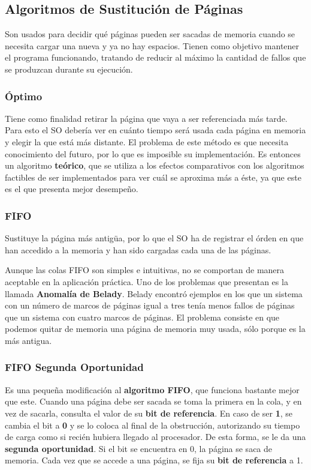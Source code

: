 \documentclass[10pt,a4paper]{article}
\begin{document}
\subsection{Algoritmos de Sustitución de Páginas}
Son usados para decidir qué páginas pueden ser sacadas de memoria cuando se necesita cargar una nueva y ya no hay espacios. Tienen como objetivo mantener el programa funcionando, tratando de reducir al máximo la cantidad de fallos que se produzcan durante su ejecución.

\subsubsection{Óptimo}
Tiene como finalidad retirar la página que vaya a ser referenciada más tarde. Para esto el SO debería ver en cuánto tiempo será usada cada página en memoria y elegir la que está más distante. El problema de este método es que necesita conocimiento del futuro, por lo que es imposible su implementación. Es entonces un algoritmo \textbf{teórico}, que se utiliza a los efectos comparativos con los algoritmos factibles de ser implementados para ver cuál se aproxima más a éste, ya que este es el que presenta mejor desempeño.

\subsubsection{FIFO}
Sustituye la página más antigüa, por lo que el SO ha de registrar el órden en que han accedido a la memoria y han sido cargadas cada una de las páginas.

Aunque las colas FIFO son simples e intuitivas, no se comportan de manera aceptable en la aplicación práctica. Uno de los problemas que presentan es la llamada \textbf{Anomalía de Belady}. Belady encontró ejemplos en los que un sistema con un número de marcos de páginas igual a tres tenía menos fallos de páginas que un sistema con cuatro marcos de páginas. El problema consiste en que podemos quitar de memoria una página de memoria muy usada, sólo porque es la más antigua.

\subsubsection{FIFO Segunda Oportunidad}
Es una pequeña modificación al \textbf{algoritmo FIFO}, que funciona bastante mejor que este. Cuando una página debe ser sacada se toma la primera en la cola, y en vez de sacarla, consulta el valor de su \textbf{bit de referencia}. En caso de ser \textbf{1}, se cambia el bit a \textbf{0} y se lo coloca al final de la obstrucción, autorizando su tiempo de carga como si recién hubiera llegado al procesador. De esta forma, se le da una \textbf{segunda oportunidad}. Si el bit se encuentra en 0, la página se saca de memoria. Cada vez que se accede a una página, se fija su \textbf{bit de referencia} a 1.
\end{document}

